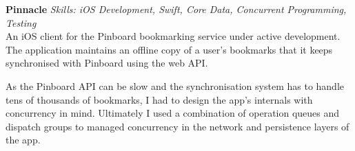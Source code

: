 \textbf{Pinnacle}  \newline
\textit{Skills: iOS Development, Swift, Core Data, Concurrent Programming, Testing} \\
An iOS client for the Pinboard bookmarking service under active development. The
application maintains an offline copy of a user's bookmarks that it keeps
synchronised with Pinboard using the web API.

As the Pinboard API can be slow and the synchronisation system has to handle
tens of thousands of bookmarks, I had to design the app's internals with
concurrency in mind. Ultimately I used a combination of operation queues and
dispatch groups to managed concurrency in the network and persistence layers of
the app.

